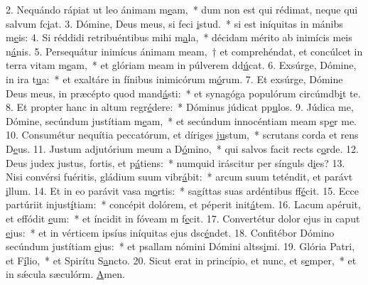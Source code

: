 2. Nequándo rápiat ut leo ánimam m\uline{e}am,~* dum non est qui rédimat, neque qui salvum fc\uline{i}at.
3. Dómine, Deus meus, si feci \uline{i}stud.~* si est iníquitas in mánibs m\uline{e}is:
4. Si réddidi retribuéntibus mihi m\uline{a}la,~* décidam mérito ab inimícis meis n\uline{á}nis.
5. Persequátur inimícus ánimam meam,~† et comprehéndat, et concúlcet in terra vitam m\uline{e}am,~* et glóriam meam in púlverem dd\uline{ú}cat.
6. Exsúrge, Dómine, in ira t\uline{u}a:~* et exaltáre in fínibus inimicórum m\uline{ó}rum.
7. Et exsúrge, Dómine Deus meus, in præcépto quod mand\uline{á}sti:~* et synagóga populórum circúmdb\uline{i}t te.
8. Et propter hanc in altum regr\uline{é}dere:~* Dóminus júdicat pp\uline{u}los.
9. Júdica me, Dómine, secúndum justítiam m\uline{e}am,~* et secúndum innocéntiam meam sp\uline{e}r me.
10. Consumétur nequítia peccatórum, et díriges j\uline{u}stum,~* scrutans corda et rens D\uline{e}us.
11. Justum adjutórium meum a D\uline{ó}mino,~* qui salvos facit rects c\uline{o}rde.
12. Deus judex justus, fortis, et p\uline{á}tiens:~* numquid iráscitur per sínguls d\uline{i}es?
13. Nisi convérsi fuéritis, gládium suum vibr\uline{á}bit:~* arcum suum teténdit, et parávt \uline{i}llum.
14. Et in eo parávit vasa m\uline{o}rtis:~* sagíttas suas ardéntibus ff\uline{é}cit.
15. Ecce partúriit injust\uline{í}tiam:~* concépit dolórem, et péperit init\uline{á}tem.
16. Lacum apéruit, et effódit \uline{e}um:~* et íncidit in fóveam m f\uline{e}cit.
17. Convertétur dolor ejus in caput \uline{e}jus:~* et in vérticem ipsíus iníquitas ejus dsc\uline{é}ndet.
18. Confitébor Dómino secúndum justítiam \uline{e}jus:~* et psallam nómini Dómini altss\uline{i}mi.
19. Glória Patri, et F\uline{í}lio,~* et Spirítu S\uline{a}ncto.
20. Sicut erat in princípio, et nunc, et s\uline{e}mper,~* et in sǽcula sæculórm. \uline{A}men.
